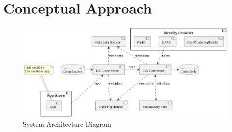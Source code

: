 \documentclass{article}
\begin{document}






\section{Conceptual Approach} %
\label{sec:conceptual-approach}


\begin{figure}[ht]
    \centering
    \includegraphics[width=\textwidth]{components}
    \caption{System Architecture Diagram}
    \label{fig:system-architecture}
\end{figure}
\end{document}
